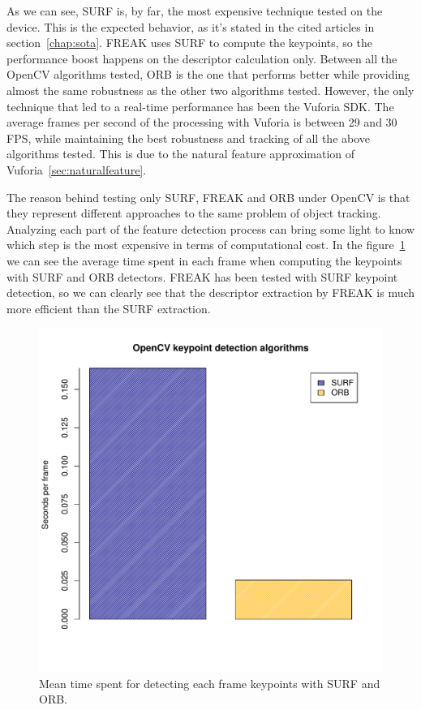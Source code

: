 As we can see, SURF is, by far, the most expensive technique tested on the device. This is the
expected behavior, as it's stated in the cited articles in
section~\ref{chap:sota}. FREAK uses SURF to compute 
the keypoints, so the performance boost happens on the descriptor calculation
only. Between all the OpenCV algorithms tested, ORB is the one that performs better
while providing almost the same robustness as the other two algorithms tested.
However, the only technique that led to a real-time performance has been the Vuforia
SDK. The average frames per second of the processing with Vuforia is between 29 and
30 FPS, while maintaining the best robustness and tracking of all the above
algorithms tested. This is due to the natural feature
approximation of Vuforia~\ref{sec:naturalfeature}.

The reason behind testing only SURF, FREAK and ORB under OpenCV is that they
represent different approaches to the same problem of object tracking. Analyzing
each part of the feature detection process can bring some light to know which step
is the most expensive in terms of computational cost. In the
figure~\ref{fig:kpperformance} we can see the average time spent in each frame when
computing the keypoints with SURF and ORB detectors. FREAK has been tested with SURF
keypoint detection, so we can clearly see that the descriptor extraction by FREAK is
much more efficient than the SURF extraction.

\begin{figure}
\centering
\includegraphics[scale=0.75]{performance/keypoints.pdf}
\caption{\label{fig:kpperformance} Mean time spent for detecting each frame
  keypoints with SURF and ORB.}
\end{figure} 

